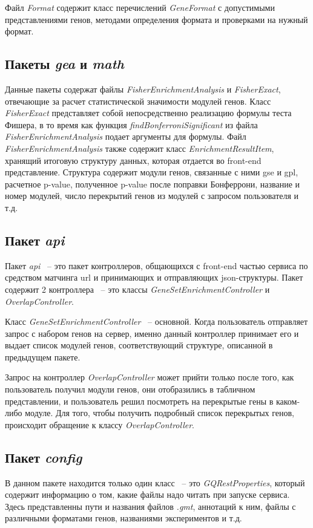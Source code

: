 \documentclass[times,specification,annotation]{itmo-student-thesis}
\begin{document}
Файл \textit{Format} содержит класс перечислений \textit{GeneFormat} с допустимыми представлениями генов, методами определения формата и проверками на нужный формат. 

\subsection{Пакеты \textit{gea} и \textit{math}}
Данные пакеты содержат файлы \textit{FisherEnrichmentAnalysis} и \textit{FisherExact}, отвечающие за расчет статистической значимости модулей генов. Класс \textit{FisherExact} представляет собой непосредственно реализацию формулы теста Фишера, в то время как функция \textit{findBonferroniSignificant} из файла \textit{FisherEnrichmentAnalysis} подает аргументы для формулы. Файл \textit{FisherEnrichmentAnalysis} также содержит класс \textit{EnrichmentResultItem}, хранящий итоговую структуру данных, которая отдается во front-end представление. Структура содержит модули генов, связанные с ними gse и gpl, расчетное p-value, полученное p-value после поправки Бонферрони, название и номер модулей, число перекрытий генов из модулей с запросом пользователя и т.д.  


\subsection{Пакет \textit{api}}
Пакет \textit{api} ~-- это пакет контроллеров, общающихся с front-end частью сервиса по средством матчинга url и принимающих и отправляющих json-структуры. Пакет содержит 2 контроллера ~-- это классы \textit{GeneSetEnrichmentController} и \textit{OverlapController}. 

Класс \textit{GeneSetEnrichmentController} ~-- основной. Когда пользователь отправляет запрос с набором генов на сервер, именно данный контроллер принимает его и выдает список модулей генов, соответствующий структуре, описанной в предыдущем пакете.  

Запрос на контроллер \textit{OverlapController} может прийти только после того, как пользователь получил модули генов, они отобразились в табличном представлении, и пользователь решил посмотреть на перекрытые гены в каком-либо модуле. Для того, чтобы получить подробный список перекрытых генов, происходит обращение к классу \textit{OverlapController}.

\subsection{Пакет \textit{config}}
В данном пакете находится только один класс ~-- это \textit{GQRestProperties}, который содержит информацию о том, какие файлы надо читать при запуске сервиса. Здесь представленны пути и названия файлов \textit{.gmt}, аннотаций к ним, файлы с различными форматами генов, названиями экспериментов и т.д. 
\end{document}
